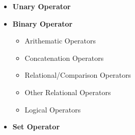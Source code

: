 \setlength{\columnsep}{3pt}
\begin{flushleft}

	\begin{itemize}
		\item \textbf{Unary Operator}
		\item \textbf{Binary Operator}
		\begin{itemize}
			\item Arithematic Operators
			\item Concatenation Operators
			\item Relational/Comparison Operators
			\item Other Relational Operators
			\item Logical Operators
		\end{itemize}
		\item \textbf{Set Operator}
	\end{itemize}
	
\end{flushleft}

\newpage

